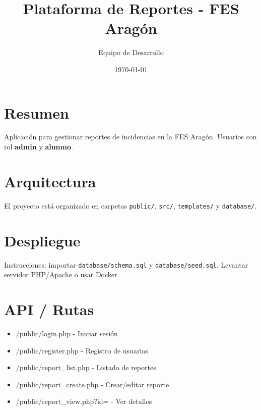 \documentclass{article}
\title{Plataforma de Reportes - FES Aragón}
\author{Equipo de Desarrollo}
\date{\today}
\begin{document}
\maketitle
\section{Resumen}
Aplicación para gestionar reportes de incidencias en la FES Aragón. Usuarios con rol \textbf{admin} y \textbf{alumno}.

\section{Arquitectura}
El proyecto está organizado en carpetas \texttt{public/}, \texttt{src/}, \texttt{templates/} y \texttt{database/}.

\section{Despliegue}
Instrucciones: importar \texttt{database/schema.sql} y \texttt{database/seed.sql}. Levantar servidor PHP/Apache o usar Docker.

\section{API / Rutas}
\begin{itemize}
  \item /public/login.php - Iniciar sesión
  \item /public/register.php - Registro de usuarios
  \item /public/report_list.php - Listado de reportes
  \item /public/report_create.php - Crear/editar reporte
  \item /public/report_view.php?id= - Ver detalles
\end{itemize}
\end{document}
